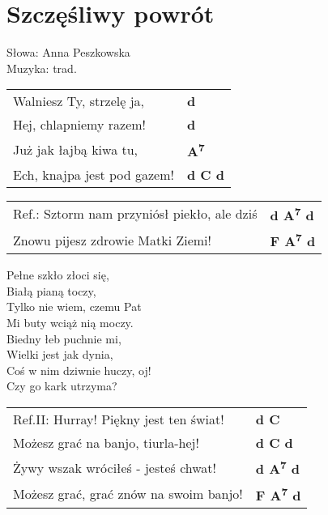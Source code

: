 \section{Szczęśliwy powrót}

Słowa: Anna Peszkowska \\
Muzyka:  trad.

\vspace{2em}
\begin{tabular}{@{}p{9cm}@{}l@{}}
Walniesz Ty, strzelę ja, & \bfseries  d \\
Hej, chlapniemy razem!  & \bfseries  d \\
Już jak łajbą kiwa tu, & \bfseries  A\textsuperscript{7} \\
Ech, knajpa jest pod gazem! & \bfseries  d C d \\
\end{tabular}

\vspace{1em}
\begin{tabular}{@{}p{9cm}@{}l@{}}
Ref.: Sztorm nam przyniósł piekło, ale dziś & \bfseries  d A\textsuperscript{7} d \\
Znowu pijesz zdrowie Matki Ziemi! & \bfseries  F A\textsuperscript{7} d \\
\end{tabular}

\vspace{1em}
Pełne szkło złoci się, \\
Białą pianą toczy, \\
Tylko nie wiem, czemu Pat \\
Mi buty wciąż nią moczy. \\

Biedny łeb puchnie mi, \\
Wielki jest jak dynia, \\
Coś w nim dziwnie huczy, oj! \\
Czy go kark utrzyma? \\

\vspace{1em}
\begin{tabular}{@{}p{9cm}@{}l@{}}
Ref.II: Hurray! Piękny jest ten świat! & \bfseries  d C \\
Możesz grać na banjo, tiurla-hej! & \bfseries  d C d \\
Żywy wszak wróciłeś - jesteś chwat! & \bfseries  d A\textsuperscript{7} d \\
Możesz grać, grać znów na swoim banjo! & \bfseries  F A\textsuperscript{7} d \\
\end{tabular}

